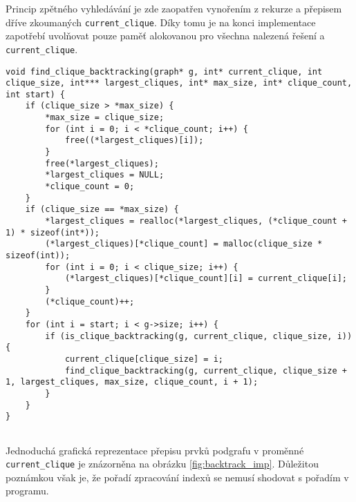 \documentclass[a4paper]{article}
\begin{document}
        \noindent
        Princip zpětného vyhledávání je zde zaopatřen vynořením z rekurze a přepisem dříve zkoumaných \lstinline{current_clique}. Díky tomu je na konci implementace zapotřebí uvolňovat pouze paměť alokovanou pro všechna nalezená řešení a \lstinline{current_clique}.\\

         \begin{lstlisting}[caption={Zjednodušený kód pro rekurzivní funkci využitou při implementace metody zpětným vyhledáváním.}, captionpos=b]
void find_clique_backtracking(graph* g, int* current_clique, int clique_size, int*** largest_cliques, int* max_size, int* clique_count, int start) {
    if (clique_size > *max_size) {
        *max_size = clique_size;
        for (int i = 0; i < *clique_count; i++) {
            free((*largest_cliques)[i]);
        }
        free(*largest_cliques);
        *largest_cliques = NULL;
        *clique_count = 0;
    }
    if (clique_size == *max_size) {
        *largest_cliques = realloc(*largest_cliques, (*clique_count + 1) * sizeof(int*));
        (*largest_cliques)[*clique_count] = malloc(clique_size * sizeof(int));
        for (int i = 0; i < clique_size; i++) {  
            (*largest_cliques)[*clique_count][i] = current_clique[i];
        }
        (*clique_count)++; 
    }
    for (int i = start; i < g->size; i++) {
        if (is_clique_backtracking(g, current_clique, clique_size, i)) {
            current_clique[clique_size] = i;
            find_clique_backtracking(g, current_clique, clique_size + 1, largest_cliques, max_size, clique_count, i + 1);
        }
    }
}
        
         \end{lstlisting}

         \noindent
         Jednoduchá grafická reprezentace přepisu prvků podgrafu v proměnné \lstinline{current_clique} je znázorněna na obrázku \ref{fig:backtrack_imp}. Důležitou poznámkou však je, že pořadí zpracování indexů se nemusí shodovat s pořadím v programu.
\end{document}
